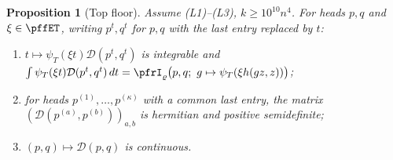 \documentclass[10pt]{amsart}
\newtheorem{proposition}[theorem]{Proposition}
\theoremstyle{definition}
\theoremstyle{remark}
\begin{document}
\begin{proposition}[Top floor]\label{pff:top}
Assume (L1)--(L3), $k\ge10^{10}n^4$. For heads $p,q$ and $\xi\in\pffET$, writing $p^t,q^t$ for $p,q$ with
the last entry replaced by $t$:
\begin{enumerate}
\item[(a)] $t\mapsto\psi_T(\xi t)\mathcal D(p^t,q^t)$ is integrable and
$\int\psi_T(\xi t)\mathcal D(p^t,q^t)\,dt=\pfrI_\varrho\bigl(p,q;\ g\mapsto\psi_T(\xi h(gz,z))\bigr)$;
\item[(b)] for heads $p^{(1)},\dots,p^{(\kappa)}$ with a common last entry, the matrix
$(\mathcal D(p^{(a)},p^{(b)}))_{a,b}$ is hermitian and positive semidefinite;
\item[(c)] $(p,q)\mapsto\mathcal D(p,q)$ is continuous.
\end{enumerate}
\end{proposition}
\end{document}
